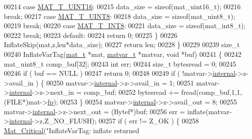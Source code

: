\begin{DoxyCode}
{{{{00214         \textcolor{keywordflow}{case} \hyperlink{group___m_a_t_ggacf7b3b879282b7ab3a51190e49bf3453a05bc7af7680aa68be95126ae0a4c2e31}{MAT\_T\_UINT16}:
00215             data\_size = \textcolor{keyword}{sizeof}(mat\_uint16\_t);
00216             \textcolor{keywordflow}{break};
00217         \textcolor{keywordflow}{case} \hyperlink{group___m_a_t_ggacf7b3b879282b7ab3a51190e49bf3453a01c1bd7db68f90552862eb5d311be408}{MAT\_T\_UINT8}:
00218             data\_size = \textcolor{keyword}{sizeof}(mat\_uint8\_t);
00219             \textcolor{keywordflow}{break};
00220         \textcolor{keywordflow}{case} \hyperlink{group___m_a_t_ggacf7b3b879282b7ab3a51190e49bf3453a9807f5033ed4f9b548953742d9fd1658}{MAT\_T\_INT8}:
00221             data\_size = \textcolor{keyword}{sizeof}(mat\_int8\_t);
00222             \textcolor{keywordflow}{break};
00223         \textcolor{keywordflow}{default}:
00224             \textcolor{keywordflow}{return} 0;
00225     \}
00226     InflateSkip(mat,z,len*data\_size);
00227     \textcolor{keywordflow}{return} len;
00228 \}
00229 
00239 \textcolor{keywordtype}{size\_t}
00240 InflateVarTag(\hyperlink{struct__mat__t}{mat\_t} *mat, \hyperlink{group___m_a_t_structmatvar__t}{matvar\_t} *matvar, \textcolor{keywordtype}{void} *buf)
00241 \{
00242     mat\_uint8\_t comp\_buf[32];
00243     \textcolor{keywordtype}{int}    err;
00244     \textcolor{keywordtype}{size\_t} bytesread = 0;
00245 
00246     \textcolor{keywordflow}{if} ( buf == NULL )
00247         \textcolor{keywordflow}{return} 0;
00248 
00249     \textcolor{keywordflow}{if} ( !matvar->\hyperlink{group___m_a_t_a6e97e3ed9f40c49322c18561c2a94e92}{internal}->z->avail\_in ) \{
00250         matvar->\hyperlink{group___m_a_t_a6e97e3ed9f40c49322c18561c2a94e92}{internal}->z->avail\_in = 1;
00251         matvar->\hyperlink{group___m_a_t_a6e97e3ed9f40c49322c18561c2a94e92}{internal}->z->next\_in = comp\_buf;
00252         bytesread += fread(comp\_buf,1,1,(FILE*)mat->\hyperlink{struct__mat__t_a85f562e407ca9ad4d2a6e14f839432b7}{fp});
00253     \}
00254     matvar->\hyperlink{group___m_a_t_a6e97e3ed9f40c49322c18561c2a94e92}{internal}->z->avail\_out = 8;
00255     matvar->\hyperlink{group___m_a_t_a6e97e3ed9f40c49322c18561c2a94e92}{internal}->z->next\_out = (Bytef*)buf;
00256     err = inflate(matvar->\hyperlink{group___m_a_t_a6e97e3ed9f40c49322c18561c2a94e92}{internal}->z,Z\_NO\_FLUSH);
00257     \textcolor{keywordflow}{if} ( err != Z\_OK ) \{
00258         \hyperlink{group__mat__util_gaf51f2bfbb5580f575e4dd79757e2b80c}{Mat\_Critical}(\textcolor{stringliteral}{"InflateVarTag: inflate returned %
}}}}}
\end{DoxyCode}

